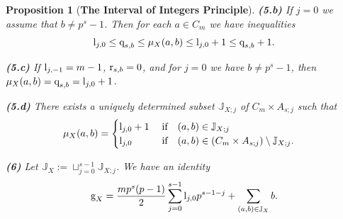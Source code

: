 \documentclass[11pt]{amsart}
\newtheorem{proposition}[theorem]{Proposition}
\def\l{\textup{l}}
\def\r{\textup{r}}
\def\q{\textup{q}}
\begin{document}
\begin{proposition}[{\bf The Interval of Integers Principle}]
\noindent
{\bf (5.b)} If $j=0$ we assume that $b\neq p^s-1$. Then for each $a\in C_m$ we have inequalities 
$$\l_{j,0}\le \q_{s,b}\le\mu_X(a,b)\le \l_{j,0}+1\le\q_{s,b}+1.$$

\noindent
{\bf (5.c)} If $\l_{j,-1}=m-1$, $\r_{s,b}=0$, and for $j=0$ we have $b\neq p^s-1$, then $\mu_X(a,b)=\q_{s,b}=\l_{j,0}+1$.

\noindent
{\bf (5.d)} There exists a uniquely determined subset $\mathbb J_{X;j}$ of $C_m\times A_{s;j}$ such that 
$$\mu_X(a,b)=\begin{cases}\l_{j,0}+1\quad\;\textup{if}\quad (a,b)\in\mathbb J_{X;j}\\
\l_{j,0}\quad\quad\quad\textup{if}\quad (a,b)\in(C_m\times A_{s;j})\setminus\mathbb J_{X;j}.\end{cases}$$

{\bf (6)} Let $\mathbb J_X:=\sqcup_{j=0}^{s-1}\mathbb J_{X;j}$. We have an identity
$$\textup{g}_X=\frac{mp^s(p-1)}{2}\sum_{j=0}^{s-1} \l_{j,0}p^{s-1-j}+\sum_{(a,b)\in\mathbb J_X} b.$$
\end{proposition}
\end{document}
